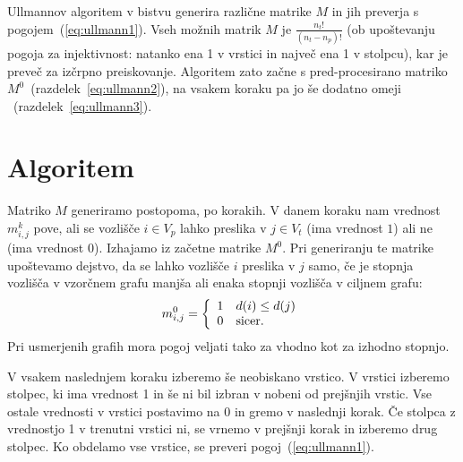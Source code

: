 \documentclass[a4paper, 12pt, ]{book}
\begin{document}
	Ullmannov algoritem v bistvu generira različne matrike $M$ in jih preverja s pogojem~(\ref{eq:ullmann1}). Vseh možnih matrik $M$ je
	$\frac{n_t!}{(n_t-n_p)!}$ (ob upoštevanju pogoja za injektivnost: natanko ena 1 v vrstici in največ ena 1 v stolpcu), kar je preveč za izčrpno preiskovanje.
	Algoritem zato začne s pred-procesirano matriko $M^0$~(razdelek~\ref{eq:ullmann2}), na vsakem koraku pa jo še dodatno omeji
	~(razdelek~\ref{eq:ullmann3}).
	
	
	\section{Algoritem}
	Matriko $M$ generiramo postopoma, po korakih. V danem koraku nam vrednost $m_{i,j}^k$ pove, ali se vozlišče $i \in V_p$ lahko preslika 
	v $j \in V_t$ (ima vrednost $1$) ali ne	(ima vrednost $0$). Izhajamo iz začetne matrike $M^0$. Pri generiranju te matrike upoštevamo dejstvo, da
	se lahko vozlišče $i$ preslika v $j$ samo, če je stopnja vozlišča v vzorčnem grafu manjša ali enaka stopnji vozlišča v ciljnem grafu:
		\begin{equation}
		\label{eq:ullmann2}
		m_{i,j}^0 = \left\{ 
		  \begin{array}{l l}
		    1 & \text{$d(i) \leq d(j)$}\\
		    0 & \text{sicer.}
		  \end{array} \right.
		\end{equation}
	Pri usmerjenih grafih mora pogoj  veljati tako za vhodno kot za izhodno stopnjo.
	
	V vsakem naslednjem koraku izberemo še neobiskano vrstico. V vrstici izberemo stolpec, ki ima vrednost 1 in še ni bil izbran v nobeni od prejšnjih vrstic.
	Vse ostale vrednosti v vrstici postavimo na 0
	in gremo v naslednji korak. Če stolpca z vrednostjo 1 v trenutni vrstici ni, se vrnemo v prejšnji korak in izberemo drug stolpec. Ko obdelamo vse vrstice,
	se preveri pogoj~(\ref{eq:ullmann1}).
	
\end{document}
